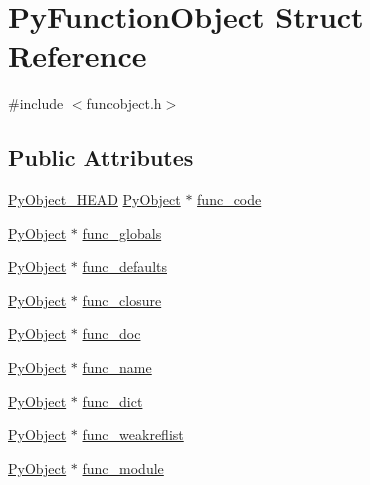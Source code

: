 \hypertarget{struct_py_function_object}{}\section{Py\+Function\+Object Struct Reference}
\label{struct_py_function_object}


{\ttfamily \#include $<$funcobject.\+h$>$}

\subsection*{Public Attributes}
\begin{DoxyCompactItemize}
\item 
\mbox{\hyperlink{_python27_2object_8h_a0bf35c1f3ea13f925de94d8593db3b7e}{Py\+Object\+\_\+\+H\+E\+AD}} \mbox{\hyperlink{_python27_2object_8h_aadc84ac7aed2cfa6f20c25f62bf3dac7}{Py\+Object}} $\ast$ \mbox{\hyperlink{struct_py_function_object_a6c5f4d38976ab36a863e6e5d03581cd1}{func\+\_\+code}}
\item 
\mbox{\hyperlink{_python27_2object_8h_aadc84ac7aed2cfa6f20c25f62bf3dac7}{Py\+Object}} $\ast$ \mbox{\hyperlink{struct_py_function_object_a236accb7c482a4e856b70b8fb082debd}{func\+\_\+globals}}
\item 
\mbox{\hyperlink{_python27_2object_8h_aadc84ac7aed2cfa6f20c25f62bf3dac7}{Py\+Object}} $\ast$ \mbox{\hyperlink{struct_py_function_object_ae6c99ddf86631063aaeb760e324036fd}{func\+\_\+defaults}}
\item 
\mbox{\hyperlink{_python27_2object_8h_aadc84ac7aed2cfa6f20c25f62bf3dac7}{Py\+Object}} $\ast$ \mbox{\hyperlink{struct_py_function_object_aafd3e2863284c80370b4fefa2116e120}{func\+\_\+closure}}
\item 
\mbox{\hyperlink{_python27_2object_8h_aadc84ac7aed2cfa6f20c25f62bf3dac7}{Py\+Object}} $\ast$ \mbox{\hyperlink{struct_py_function_object_aae1ad9ce5d3f2951306948a08f4c12dd}{func\+\_\+doc}}
\item 
\mbox{\hyperlink{_python27_2object_8h_aadc84ac7aed2cfa6f20c25f62bf3dac7}{Py\+Object}} $\ast$ \mbox{\hyperlink{struct_py_function_object_a5667a7154d870b8644a469a735283fc8}{func\+\_\+name}}
\item 
\mbox{\hyperlink{_python27_2object_8h_aadc84ac7aed2cfa6f20c25f62bf3dac7}{Py\+Object}} $\ast$ \mbox{\hyperlink{struct_py_function_object_a291b33faa7d01907b1ddbc07e4f37409}{func\+\_\+dict}}
\item 
\mbox{\hyperlink{_python27_2object_8h_aadc84ac7aed2cfa6f20c25f62bf3dac7}{Py\+Object}} $\ast$ \mbox{\hyperlink{struct_py_function_object_abef9b746762125a815e52b8c6754f36e}{func\+\_\+weakreflist}}
\item 
\mbox{\hyperlink{_python27_2object_8h_aadc84ac7aed2cfa6f20c25f62bf3dac7}{Py\+Object}} $\ast$ \mbox{\hyperlink{struct_py_function_object_a77f851f25b514b4a7d902eeba5f3b681}{func\+\_\+module}}
\end{DoxyCompactItemize}


